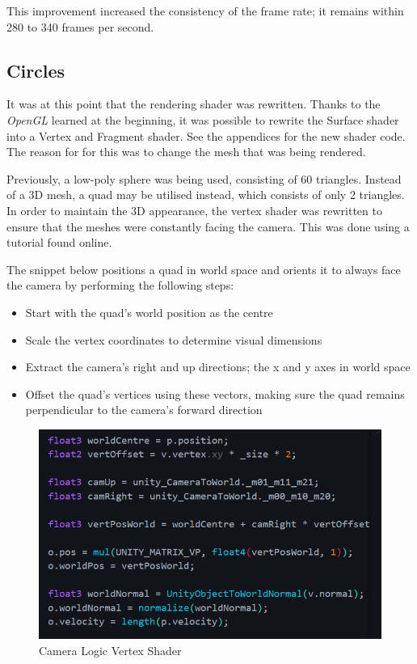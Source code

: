 \documentclass[a4paper, 12pt]{article}
\begin{document}
    This improvement increased the consistency of the frame rate; it remains within 280 to 340 frames per second.

    \subsection{Circles}

    It was at this point that the rendering shader was rewritten. Thanks to the \textit{OpenGL} learned at the beginning, it was possible to rewrite the Surface shader into a Vertex and Fragment shader. See the appendices for the new shader code. The reason for for this was to change the mesh that was being rendered. 
    
    Previously, a low-poly sphere was being used, consisting of 60 triangles. Instead of a 3D mesh, a quad may be utilised instead, which consists of only 2 triangles. In order to maintain the 3D appearance, the vertex shader was rewritten to ensure that the meshes were constantly facing the camera. This was done using a tutorial found online\cite{lague2}.

    The snippet below positions a quad in world space and orients it to always face the camera by performing the following steps:
    \begin{itemize}
        \item Start with the quad's world position as the centre
        \item Scale the vertex coordinates to determine visual dimensions
        \item Extract the camera's right and up directions; the x and y axes in world space
        \item Offset the quad's vertices using these vectors, making sure the quad remains perpendicular to the camera's forward direction
    \end{itemize}

    \begin{figure}[H]
        \begin{center}
            \includegraphics[]{cameraLogic.png}
            \caption{Camera Logic Vertex Shader \cite{lague2}}
        \end{center}
    \end{figure}
\end{document}
